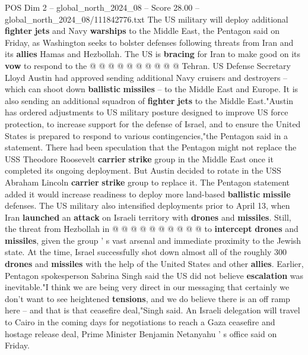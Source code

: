 \begin{textsample}{POS Dim 2 – global\_north\_2024\_08 – Score 28.00 – global\_north\_2024\_08/111842776.txt}
The US military will deploy additional \textbf{fighter} \textbf{jets} and Navy \textbf{warships} to the Middle East, the Pentagon said on Friday, as Washington seeks to bolster defenses following threats from Iran and its \textbf{allies} Hamas and Hezbollah.
The US is \textbf{bracing} for Iran to make good on its \textbf{vow} to respond to the @ @ @ @ @ @ @ @ @ @ Tehran.
US Defense Secretary Lloyd Austin had approved sending additional Navy cruisers and destroyers -- which can shoot down \textbf{ballistic} \textbf{missiles} -- to the Middle East and Europe.
It is also sending an additional squadron of \textbf{fighter} \textbf{jets} to the Middle East."Austin has ordered adjustments to US military posture designed to improve US force protection, to increase support for the defense of Israel, and to ensure the United States is prepared to respond to various contingencies,"the Pentagon said in a statement.
There had been speculation that the Pentagon might not replace the USS Theodore Roosevelt \textbf{carrier} \textbf{strike} group in the Middle East once it completed its ongoing deployment.
But Austin decided to rotate in the USS Abraham Lincoln \textbf{carrier} \textbf{strike} group to replace it.
The Pentagon statement added it would increase readiness to deploy more land-based \textbf{ballistic} \textbf{missile} defenses.
The US military also intensified deployments prior to April 13, when Iran \textbf{launched} an \textbf{attack} on Israeli territory with \textbf{drones} and \textbf{missiles}.
Still, the threat from Hezbollah in @ @ @ @ @ @ @ @ @ @ to \textbf{intercept} \textbf{drones} and \textbf{missiles}, given the group ' s vast arsenal and immediate proximity to the Jewish state.
At the time, Israel successfully shot down almost all of the roughly 300 \textbf{drones} and \textbf{missiles} with the help of the United States and other \textbf{allies}.
Earlier, Pentagon spokesperson Sabrina Singh said the US did not believe \textbf{escalation} was inevitable."I think we are being very direct in our messaging that certainly we don't want to see heightened \textbf{tensions}, and we do believe there is an off ramp here -- and that is that ceasefire deal,"Singh said.
An Israeli delegation will travel to Cairo in the coming days for negotiations to reach a Gaza ceasefire and hostage release deal, Prime Minister Benjamin Netanyahu ' s office said on Friday.

\end{textsample}
